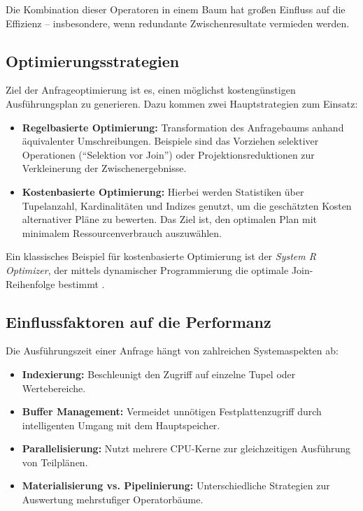 \documentclass[12pt]{article}
\begin{document}
Die Kombination dieser Operatoren in einem Baum hat großen Einfluss auf die Effizienz – insbesondere, wenn redundante Zwischenresultate vermieden werden.

\subsection{Optimierungsstrategien}

Ziel der Anfrageoptimierung ist es, einen möglichst kostengünstigen Ausführungsplan zu generieren. Dazu kommen zwei Hauptstrategien zum Einsatz:

\begin{itemize}
    \item \textbf{Regelbasierte Optimierung:} Transformation des Anfragebaums anhand äquivalenter Umschreibungen. Beispiele sind das Vorziehen selektiver Operationen (``Selektion vor Join'') oder Projektionsreduktionen zur Verkleinerung der Zwischenergebnisse.
    
    \item \textbf{Kostenbasierte Optimierung:} Hierbei werden Statistiken über Tupelanzahl, Kardinalitäten und Indizes genutzt, um die geschätzten Kosten alternativer Pläne zu bewerten. Das Ziel ist, den optimalen Plan mit minimalem Ressourcenverbrauch auszuwählen.
\end{itemize}

Ein klassisches Beispiel für kostenbasierte Optimierung ist der \emph{System R Optimizer}, der mittels dynamischer Programmierung die optimale Join-Reihenfolge bestimmt \cite{selinger1979access}.

\subsection{Einflussfaktoren auf die Performanz}

Die Ausführungszeit einer Anfrage hängt von zahlreichen Systemaspekten ab:

\begin{itemize}
    \item \textbf{Indexierung:} Beschleunigt den Zugriff auf einzelne Tupel oder Wertebereiche.
    \item \textbf{Buffer Management:} Vermeidet unnötigen Festplattenzugriff durch intelligenten Umgang mit dem Hauptspeicher.
    \item \textbf{Parallelisierung:} Nutzt mehrere CPU-Kerne zur gleichzeitigen Ausführung von Teilplänen.
    \item \textbf{Materialisierung vs. Pipelinierung:} Unterschiedliche Strategien zur Auswertung mehrstufiger Operatorbäume.
\end{itemize}
\end{document}
